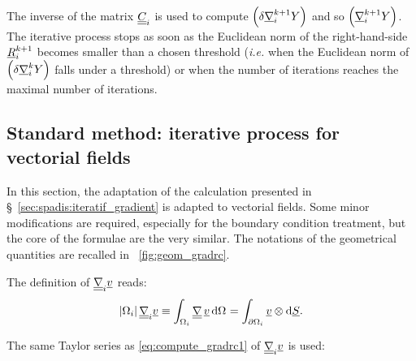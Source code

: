 The inverse of the matrix $\underline{\underline{C}}_{i}$ is used to compute $\left( \delta \underline{\nabla}_i^{k+1} Y \right)$
and so $\left( \underline{\nabla}^{k+1}_{i} Y \right)$. The iterative process stops as soon as the Euclidean norm of the right-hand-side $\underline{R}^{k+1}_{i}$ becomes smaller than a chosen threshold (\emph{i.e.} when the Euclidean norm
of $\left( \delta \underline{\nabla}^{k}_{i} Y \right)$ falls under a threshold) or when the number of iterations reaches the maximal number of iterations.

\subsection{Standard method: iterative process for vectorial fields}\label{sec:spadis:iteratif_gradient_vectors}
In this section, the adaptation of the calculation presented in \S~\ref{sec:spadis:iteratif_gradient} is adapted to
vectorial fields. Some minor modifications are required, especially for the boundary condition treatment, but the core of the
formulae are the very similar. The notations of the geometrical quantities are recalled in \figurename~\ref{fig:geom_gradrc}.

The definition of $\underline{\underline{\nabla}}_{i} \underline{v} $ reads:
\begin{equation}
\left| \Omega_{i} \right| \underline{\underline{\nabla}}_{i} \underline{v} \equiv  \displaystyle \int_{\Omega_{i}}{\underline{\underline{\nabla}} \, \underline{v} \, \mathrm{d} \Omega_{} } = \int_{\partial \Omega_{i}} \underline{v} \otimes \mathrm{d} \underline{S}.
\end{equation}

The same Taylor series as \eqref{eq:compute_gradrc1} of $\underline{\underline{\nabla}}_{i} \underline{v}$ is used:

